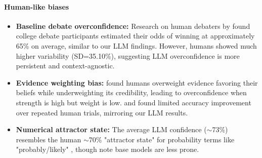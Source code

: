 \documentclass{article}
\begin{document}
\paragraph{Human-like biases}
\begin{itemize}
    \item \textbf{Baseline debate overconfidence:} Research on human debaters by \citet{RePEc:sip:dpaper:06-042} found college debate participants estimated their odds of winning at approximately 65\% on average, similar to our LLM findings. However, humans showed much higher variability (SD=35.10\%), suggesting LLM overconfidence is more persistent and context-agnostic.

    \item \textbf{Evidence weighting bias:} \citet{GriffinTversky1992} found humans overweight evidence favoring their beliefs while underweighting its credibility, leading to overconfidence when strength is high but weight is low. \citet{Moore2008} and \citet{RePEc:sip:dpaper:06-042} found limited accuracy improvement over repeated human trials, mirroring our LLM results.

    \item \textbf{Numerical attractor state:} The average LLM confidence ($\sim$73\%) resembles the human $\sim$70\% "attractor state" for probability terms like "probably/likely" \citep{Hashim2024,Mandel2019}, though \citep{west2025basemodelsbeataligned,openai2024gpt4technicalreport} note base models are less prone.
\end{itemize}
\end{document}
